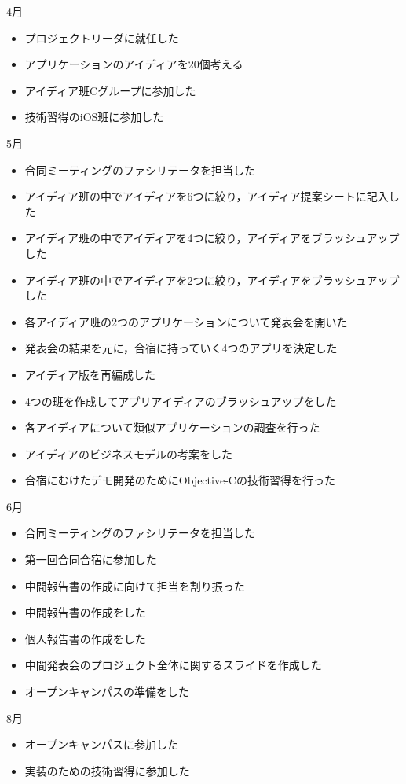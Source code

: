 4月
\begin{itemize}
\item プロジェクトリーダに就任した
\item アプリケーションのアイディアを20個考える
\item アイディア班Cグループに参加した
\item 技術習得のiOS班に参加した
\end{itemize}
5月
\begin{itemize}
\item 合同ミーティングのファシリテータを担当した
\item アイディア班の中でアイディアを6つに絞り，アイディア提案シートに記入した
\item アイディア班の中でアイディアを4つに絞り，アイディアをブラッシュアップした
\item アイディア班の中でアイディアを2つに絞り，アイディアをブラッシュアップした
\item 各アイディア班の2つのアプリケーションについて発表会を開いた
\item 発表会の結果を元に，合宿に持っていく4つのアプリを決定した
\item アイディア版を再編成した
\item 4つの班を作成してアプリアイディアのブラッシュアップをした
\item 各アイディアについて類似アプリケーションの調査を行った
\item アイディアのビジネスモデルの考案をした
\item 合宿にむけたデモ開発のためにObjective-Cの技術習得を行った
\end{itemize}
6月
\begin{itemize}
\item 合同ミーティングのファシリテータを担当した
\item 第一回合同合宿に参加した
\item 中間報告書の作成に向けて担当を割り振った
\item 中間報告書の作成をした
\item 個人報告書の作成をした
\item 中間発表会のプロジェクト全体に関するスライドを作成した
\item オープンキャンパスの準備をした
\end{itemize}
8月
\begin{itemize}
\item オープンキャンパスに参加した
\item 実装のための技術習得に参加した
\end{itemize}
